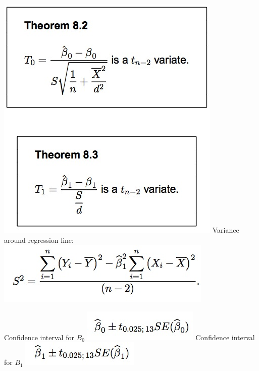 \documentclass{examnotes}
\begin{document}
\includegraphics[scale=0.4]{./img/84.jpg}
Variance around regression line:
\includegraphics[scale=0.5]{./img/s2.jpg}

Confidence interval for $B_0$
\includegraphics[scale=0.5]{./img/b0c.jpg}
Confidence interval for $B_1$
\includegraphics[scale=0.5]{./img/b1c.jpg}

\end{document}
